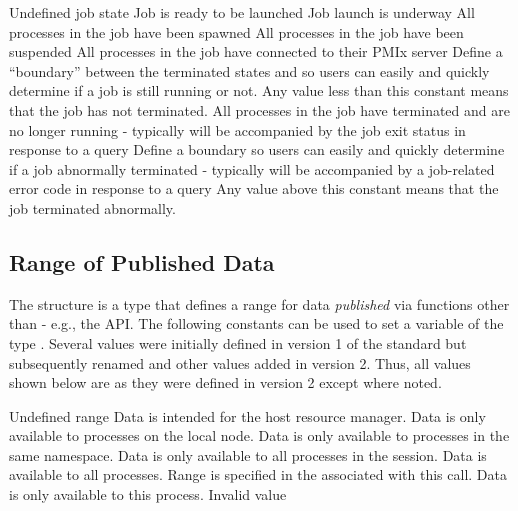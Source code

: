 \begin{constantdesc}
%
Undefined job state
%
Job is ready to be launched
%
Job launch is underway
%
All processes in the job have been spawned
%
All processes in the job have been suspended
%
All processes in the job have connected to their \ac{PMIx} server
%
Define a ``boundary'' between the terminated states and  so users can easily and quickly determine if a job is still running or not.
Any value less than this constant means that the job has not terminated.
%
All processes in the job have terminated and are no longer running - typically will be accompanied by the job exit status in response to a query
%
Define a boundary so users can easily and quickly determine if a job abnormally terminated - typically will be accompanied by a job-related error code in response to a query
Any value above this constant means that the job terminated abnormally.
%
\end{constantdesc}


\subsection{Range of Published Data}

The  structure is a  type that defines a range for data \textit{published} via functions other than  - e.g., the  \ac{API}.
The following constants can be used to set a variable of the type . Several values were initially defined in version 1 of the standard but subsequently renamed and other values added in version 2. Thus, all values shown below are as they were defined in version 2 except where noted.

\begin{constantdesc}
%
Undefined range
%
Data is intended for the host resource manager.
%
Data is only available to processes on the local node.
%
Data is only available to processes in the same namespace.
%
Data is only available to all processes in the session.
%
Data is available to all processes.
%
Range is specified in the  associated with this call.
%
Data is only available to this process.
%
Invalid value
%
\end{constantdesc}

